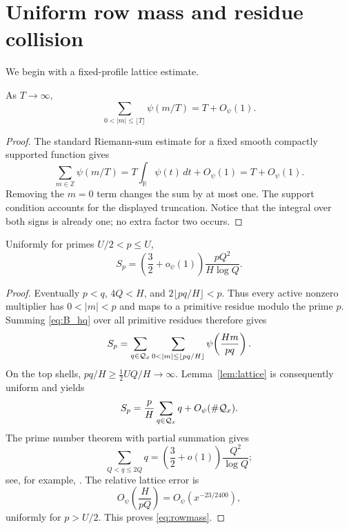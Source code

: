 \section{Uniform row mass and residue collision}\label{sec:row}

We begin with a fixed-profile lattice estimate.

\begin{lemma}\label{lem:lattice}
As $T\to\infty$,
\[
 \sum_{0<|m|\leq\lfloor T\rfloor}\psi(m/T)=T+O_\psi(1).
\]
\end{lemma}

\begin{proof}
The standard Riemann-sum estimate for a fixed smooth compactly supported
function gives
\[
 \sum_{m\in\mathbb Z}\psi(m/T)
 =T\int_{\mathbb R}\psi(t)\,dt+O_\psi(1)=T+O_\psi(1).
\]
Removing the $m=0$ term changes the sum by at most one.  The support condition
accounts for the displayed truncation.  Notice that the integral over both
signs is already one; no extra factor two occurs.
\end{proof}

\begin{lemma}\label{lem:rowmass}
Uniformly for primes $U/2<p\leq U$,
\begin{equation}\label{eq:rowmass}
 S_p=\left(\frac32+o_\psi(1)\right)
 \frac{pQ^2}{H\log Q}.
\end{equation}
\end{lemma}

\begin{proof}
Eventually $p<q$, $4Q<H$, and
$2\lfloor pq/H\rfloor<p$.  Thus every active nonzero multiplier has
$0<|m|<p$ and maps to a primitive residue modulo the prime $p$.  Summing
\eqref{eq:B_hq} over all primitive residues therefore gives
\[
 S_p=\sum_{q\in\Qx}
 \sum_{0<|m|\leq\lfloor pq/H\rfloor}
 \psi\!\left(\frac{Hm}{pq}\right).
\]
On the top shells, $pq/H\geq \tfrac12 UQ/H\to\infty$.  Lemma~\ref{lem:lattice}
is consequently uniform and yields
\[
 S_p=\frac{p}{H}\sum_{q\in\mathcal{Q}_x}q+O_\psi(\#\mathcal{Q}_x).
\]
The prime number theorem with partial summation gives
\begin{equation}\label{eq:qfirstmoment}
 \sum_{Q<q\leq2Q}q
 =\left(\frac32+o(1)\right)\frac{Q^2}{\log Q};
\end{equation}
see, for example, \cite[Chapters 1--2]{MontgomeryVaughan2006}.  The relative
lattice error is
\[
 O_\psi\!\left(\frac{H}{pQ}\right)
 =O_\psi\!\left(x^{-23/2400}\right),
\]
uniformly for $p>U/2$.  This proves \eqref{eq:rowmass}.
\end{proof}

